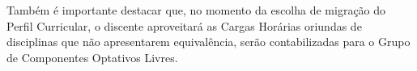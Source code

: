 Também é importante destacar que, no momento da escolha de migração do Perfil Curricular, o discente aproveitará as Cargas Horárias oriundas de disciplinas que não apresentarem equivalência, serão contabilizadas para o Grupo de Componentes Optativos Livres.
